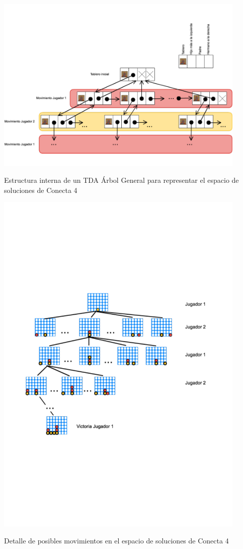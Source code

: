 \begin{DoxyImage}
\includegraphics[width=12cm]{connect4-tree}
\caption{Estructura interna de un T\-D\-A Árbol General para representar el espacio de soluciones de Conecta 4}
\end{DoxyImage}







\begin{DoxyImage}
\includegraphics[width=12cm]{connect4-tree-YR}
\caption{Detalle de posibles movimientos en el espacio de soluciones de Conecta 4}
\end{DoxyImage}



